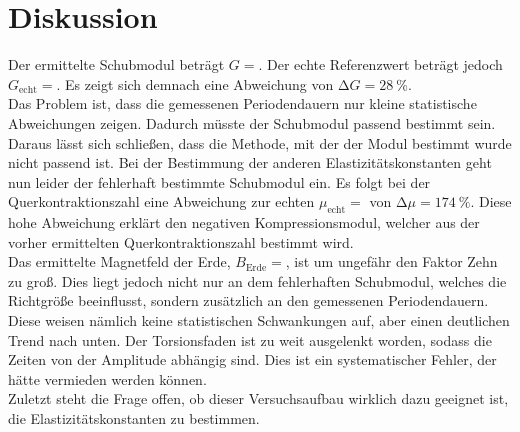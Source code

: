 \section{Diskussion}
\label{sec:Diskussion}





Der ermittelte Schubmodul beträgt $G = $.
Der echte Referenzwert beträgt jedoch $G_{\text{echt}} = $.
Es zeigt sich demnach eine Abweichung von $\increment G = \SI{28}{\percent}$.\\
Das Problem ist, dass die gemessenen Periodendauern nur kleine statistische Abweichungen zeigen.
Dadurch müsste der Schubmodul passend bestimmt sein.
Daraus lässt sich schließen, dass die Methode, mit der der Modul bestimmt wurde nicht passend ist.
Bei der Bestimmung der anderen Elastizitätskonstanten geht nun leider der fehlerhaft bestimmte Schubmodul ein.
Es folgt bei der Querkontraktionszahl eine Abweichung zur echten $\mu_{\text{echt}} = $ von $\increment \mu = \SI{174}{\percent}$.
Diese hohe Abweichung erklärt den negativen Kompressionsmodul, welcher aus der vorher ermittelten Querkontraktionszahl bestimmt wird.\\
Das ermittelte Magnetfeld der Erde, $B_{\text{Erde}}=$, ist um ungefähr den Faktor Zehn zu groß.
Dies liegt jedoch nicht nur an dem fehlerhaften Schubmodul, welches die Richtgröße beeinflusst, sondern zusätzlich an den gemessenen Periodendauern.
Diese weisen nämlich keine statistischen Schwankungen auf, aber einen deutlichen Trend nach unten.
Der Torsionsfaden ist zu weit ausgelenkt worden, sodass die Zeiten von der Amplitude abhängig sind.
Dies ist ein systematischer Fehler, der hätte vermieden werden können.\\
Zuletzt steht die Frage offen, ob dieser Versuchsaufbau wirklich dazu geeignet ist, die Elastizitätskonstanten zu bestimmen.
